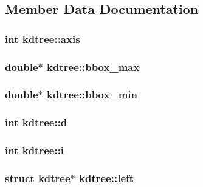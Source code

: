 \subsection{Member Data Documentation}
\hypertarget{structkdtree_aa3e8af96c003f2657f8dc9e54dab83fb}{
\subsubsection[{axis}]{\setlength{\rightskip}{0pt plus 5cm}int {\bf kdtree::axis}}}
\label{structkdtree_aa3e8af96c003f2657f8dc9e54dab83fb}
\hypertarget{structkdtree_afab5e60d86f6434f76ea43d6568416fe}{
\subsubsection[{bbox\_\-max}]{\setlength{\rightskip}{0pt plus 5cm}double$\ast$ {\bf kdtree::bbox\_\-max}}}
\label{structkdtree_afab5e60d86f6434f76ea43d6568416fe}
\hypertarget{structkdtree_ab667f9dfcc50b9e2ae470f091b890e11}{
\subsubsection[{bbox\_\-min}]{\setlength{\rightskip}{0pt plus 5cm}double$\ast$ {\bf kdtree::bbox\_\-min}}}
\label{structkdtree_ab667f9dfcc50b9e2ae470f091b890e11}
\hypertarget{structkdtree_a0ca03bfa1fdb3b13b81bb963ee11031b}{
\subsubsection[{d}]{\setlength{\rightskip}{0pt plus 5cm}int {\bf kdtree::d}}}
\label{structkdtree_a0ca03bfa1fdb3b13b81bb963ee11031b}
\hypertarget{structkdtree_ad544e0ad81ac0f012d6ca3ba1abbb857}{
\subsubsection[{i}]{\setlength{\rightskip}{0pt plus 5cm}int {\bf kdtree::i}}}
\label{structkdtree_ad544e0ad81ac0f012d6ca3ba1abbb857}
\hypertarget{structkdtree_aea8386a2f0d15772aad52cb12f14b195}{
\subsubsection[{left}]{\setlength{\rightskip}{0pt plus 5cm}struct {\bf kdtree}$\ast$ {\bf kdtree::left}}}
